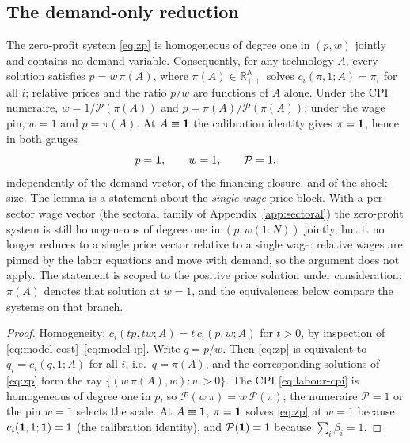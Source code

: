 \subsection{The demand-only reduction}\label{app:reduction}

\begin{lemma}\label{lem:price}
The zero-profit system \eqref{eq:zp} is homogeneous of degree one in
$(p,w)$ jointly and contains no demand variable. Consequently, for any
technology $A$, every solution satisfies $p = w\,\pi(A)$, where
$\pi(A) \in \mathbb{R}^N_{++}$ solves $c_i(\pi,1;A) = \pi_i$ for all $i$;
relative prices and the ratio $p/w$ are functions of $A$ alone. Under the
CPI numeraire, $w = 1/\mathcal{P}(\pi(A))$ and $p = \pi(A)/\mathcal{P}(\pi(A))$; under the
wage pin, $w = 1$ and $p = \pi(A)$. At $A \equiv \mathbf{1}$ the calibration
identity gives $\pi = \mathbf{1}$, hence in both gauges
\begin{equation}
p = \mathbf{1}, \qquad w = 1, \qquad \mathcal{P} = 1,
\end{equation}
independently of the demand vector, of the financing closure, and of the
shock size. The lemma is a statement about the
\emph{single-wage} price block. With a per-sector wage vector (the sectoral
family of Appendix~\ref{app:sectoral}) the zero-profit system is still
homogeneous of degree one in $(p, w(1{:}N))$ jointly, but it no longer reduces to
a single price vector relative to a single wage: relative wages are pinned by the
labor equations and move with demand, so the argument does not apply.
The statement is scoped to the positive price solution under consideration:
$\pi(A)$ denotes that solution at $w=1$,
and the equivalences below compare the systems on that branch.
\end{lemma}

\begin{proof}
Homogeneity: $c_i(tp, tw; A) = t\, c_i(p,w;A)$ for $t>0$, by inspection of
\eqref{eq:model-cost}--\eqref{eq:model-ip}. Write $q = p/w$. Then \eqref{eq:zp} is
equivalent to $q_i = c_i(q,1;A)$ for all $i$, i.e.\ $q = \pi(A)$, and
the corresponding solutions of \eqref{eq:zp} form the ray
$\{(w\,\pi(A), w):w>0\}$. The
CPI \eqref{eq:labour-cpi} is homogeneous of degree one in $p$, so
$\mathcal{P}(w\,\pi) = w\,\mathcal{P}(\pi)$; the numeraire $\mathcal{P} = 1$ or the pin $w = 1$
selects the scale. At $A \equiv \mathbf{1}$, $\pi = \mathbf{1}$ solves
\eqref{eq:zp} at $w = 1$ because $c_i(\mathbf{1},1;\mathbf{1}) = 1$ (the calibration
identity), and $\mathcal{P}(\mathbf{1}) = 1$ because $\sum_i \beta_i = 1$.
\end{proof}

